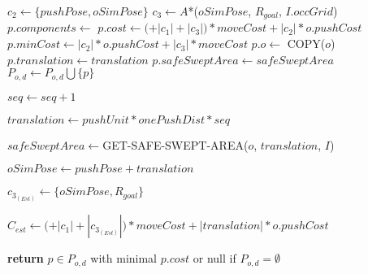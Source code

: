 \begin{algorithm}[H]
\begin{algorithmic}[1]

            \State $c_{2} \gets \{pushPose, oSimPose\}$
            \State $c_{3} \gets A$*($oSimPose$, $R_{goal}$, $I.occGrid$)
              \State $p.components \gets$ 
              \State $p.cost \gets ($$ + |c_{1}| + |c_{3}|) * moveCost + |c_{2}| * o.pushCost$
              \State $p.minCost \gets |c_{2}| * o.pushCost + |c_{3}| * moveCost$
              \State $p.o \gets$ COPY($o$)
              \State $p.translation \gets translation$
              \State $p.safeSweptArea \gets safeSweptArea$
              \State $P_{o,d} \gets P_{o,d} \bigcup \{p\}$
            \EndIf

          \State $seq \gets seq + 1$

          \State $translation \gets pushUnit * onePushDist * seq$

          \State $safeSweptArea \gets $GET-SAFE-SWEPT-AREA($o$, $translation$, $I$)

          \State $oSimPose \gets pushPose + translation$

          \State $c_{3_{(Est)}} \gets \{oSimPose, R_{goal}\}$

          \State $C_{est} \gets ($$ + |c_{1}| + |c_{3_{(Est)}}|) * moveCost + |translation| * o.pushCost$

        \EndWhile

      \EndFor

    \State \textbf{return} $p \in P_{o,d}$ with minimal $p.cost$ or null if $P_{o,d} = \emptyset$

    \EndProcedure

  \end{algorithmic}
\end{algorithm}
